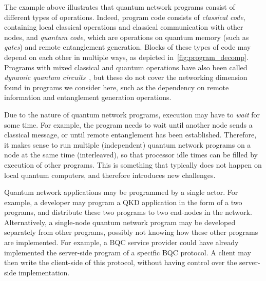 The example above illustrates that quantum network programs consist of different
types of operations.
Indeed, program code consists of \textit{classical code}, containing local classical operations and classical communication with other nodes, and \textit{quantum code}, which are operations on quantum memory (such as \textit{gates}) and remote entanglement generation.
Blocks of these types of code may depend on each other in multiple ways, as depicted in~\cref{fig:program_decomp}.
Programs with mixed classical and quantum operations have also been called \textit{dynamic quantum circuits}~\cite{cross2021openqasm, burgholzer2021towards}, but these do not cover the networking dimension found in programs we consider here, such as the dependency on remote information and entanglement generation operations.

Due to the nature of quantum network programs, execution may have to \textit{wait} for some time. For example, the program needs to wait until another node sends a classical message, or until remote entanglement has been established.
Therefore, it makes sense to run multiple (independent) quantum network programs on a node at the same time (interleaved), so that processor idle times can be filled by execution of other programs. This is something that typically does not happen on local quantum computers, and therefore introduces new challenges.

Quantum network applications may be programmed by a single actor.
For example, a developer may program a QKD application in the form of a two programs, and distribute these two programs to two end-nodes in the network.
Alternatively, a single-node quantum network program may be developed separately from other programs, possibly not knowing how these other programs are implemented.
For example, a BQC service provider could have already implemented the server-side program of a specific BQC protocol.
A client may then write the client-side of this protocol, without having control over the server-side implementation.


